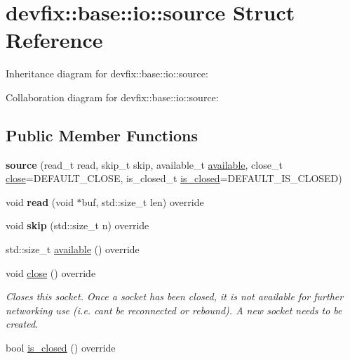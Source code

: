 \hypertarget{structdevfix_1_1base_1_1io_1_1source}{}\section{devfix\+:\+:base\+:\+:io\+:\+:source Struct Reference}
\label{structdevfix_1_1base_1_1io_1_1source}


Inheritance diagram for devfix\+:\+:base\+:\+:io\+:\+:source\+:


Collaboration diagram for devfix\+:\+:base\+:\+:io\+:\+:source\+:
\subsection*{Public Member Functions}
\begin{DoxyCompactItemize}
\item 
\mbox{\label{structdevfix_1_1base_1_1io_1_1source_af8bef20f5b54153c3fd1fbc7daa263c5}} 
{\bfseries source} (read\+\_\+t read, skip\+\_\+t skip, available\+\_\+t \hyperlink{structdevfix_1_1base_1_1io_1_1source_a911f4ba79499a623de30cf16d3d26d47}{available}, close\+\_\+t \hyperlink{structdevfix_1_1base_1_1io_1_1source_aa00a381c8a166cbbc5dbf6de4b56590e}{close}=D\+E\+F\+A\+U\+L\+T\+\_\+\+C\+L\+O\+SE, is\+\_\+closed\+\_\+t \hyperlink{structdevfix_1_1base_1_1io_1_1source_a406834cf6651d48949b96d0ef49cc6c1}{is\+\_\+closed}=D\+E\+F\+A\+U\+L\+T\+\_\+\+I\+S\+\_\+\+C\+L\+O\+S\+ED)
\item 
\mbox{\label{structdevfix_1_1base_1_1io_1_1source_a9fbd4d20aa150910ced44018e1b3156a}} 
void {\bfseries read} (void $\ast$buf, std\+::size\+\_\+t len) override
\item 
\mbox{\label{structdevfix_1_1base_1_1io_1_1source_a21cb579307589cbc6f9e02d64c66f4b2}} 
void {\bfseries skip} (std\+::size\+\_\+t n) override
\item 
std\+::size\+\_\+t \hyperlink{structdevfix_1_1base_1_1io_1_1source_a911f4ba79499a623de30cf16d3d26d47}{available} () override
\item 
\mbox{\label{structdevfix_1_1base_1_1io_1_1source_aa00a381c8a166cbbc5dbf6de4b56590e}} 
void \hyperlink{structdevfix_1_1base_1_1io_1_1source_aa00a381c8a166cbbc5dbf6de4b56590e}{close} () override
\begin{DoxyCompactList}\small\item\em Closes this socket. Once a socket has been closed, it is not available for further networking use (i.\+e. can\textquotesingle{}t be reconnected or rebound). A new socket needs to be created. \end{DoxyCompactList}\item 
bool \hyperlink{structdevfix_1_1base_1_1io_1_1source_a406834cf6651d48949b96d0ef49cc6c1}{is\+\_\+closed} () override
\end{DoxyCompactItemize}


